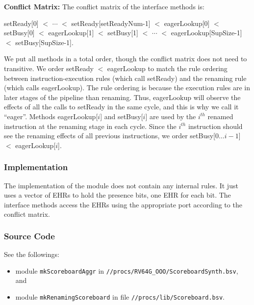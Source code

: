 \noindent\textbf{Conflict Matrix:}
The conflict matrix of the interface methods is:
\begin{center}
    setReady[0] $<$ $\cdots$ $<$ setReady[setReadyNum-1] $<$ eagerLookup[0] $<$ setBusy[0] $<$ eagerLookup[1] $<$ setBusy[1] $<$ $\cdots$ $<$ eagerLookup[SupSize-1] $<$ setBusy[SupSize-1].
\end{center}
We put all methods in a total order, though the conflict matrix does not need to transitive.
We order setReady $<$ eagerLookup to match the rule ordering between instruction-execution rules (which call setReady) and the renaming rule (which calls eagerLookup).
The rule ordering is because the execution rules are in later stages of the pipeline than renaming.
Thus, eagerLookup will observe the effects of all the calls to setReady in the same cycle, and this is why we call it ``eager''.
Methods eagerLookup[$i$] and setBusy[$i$] are used by the $i^{th}$ renamed instruction at the renaming stage in each cycle.
Since the $i^{th}$ instruction should see the renaming effects of all previous instructions, we order setBusy[$0\ldots i-1$] $<$ eagerLookup[$i$].

\subsubsection{Implementation}
The implementation of the module does not contain any internal rules.
It just uses a vector of EHRs to hold the presence bits, one EHR for each bit.
The interface methods access the EHRs using the appropriate port according to the conflict matrix.

\subsubsection{Source Code}
See the followings:
\begin{itemize}
    \item module \texttt{mkScoreboardAggr} in \texttt{//procs/RV64G\_OOO/ScoreboardSynth.bsv}, and
    \item module \texttt{mkRenamingScoreboard} in file \texttt{//procs/lib/Scoreboard.bsv}.
\end{itemize}
  